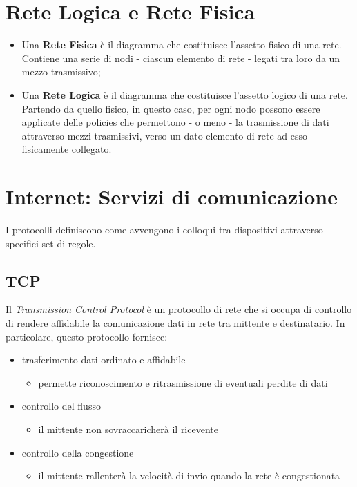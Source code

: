 \section{Rete Logica e Rete Fisica}
\begin{itemize}
    \item Una \textbf{Rete Fisica} è il diagramma che costituisce l'assetto fisico di una rete. Contiene una serie di nodi - ciascun elemento di rete - legati tra loro da un mezzo trasmissivo;
    \item Una \textbf{Rete Logica} è il diagramma che costituisce l'assetto logico di una rete. Partendo da quello fisico, in questo caso, per ogni nodo possono essere applicate delle policies che permettono - o meno - la trasmissione di dati attraverso mezzi trasmissivi, verso un dato elemento di rete ad esso fisicamente collegato.
\end{itemize}

\section{Internet: Servizi di comunicazione}
I protocolli definiscono come avvengono i colloqui tra dispositivi attraverso specifici set di regole.

\subsection{TCP}
Il \textit{Transmission Control Protocol} è un protocollo di rete che si occupa di controllo di rendere affidabile la comunicazione dati in rete tra mittente e destinatario.
In particolare, questo protocollo fornisce:
    \begin{itemize}
        \item trasferimento dati ordinato e affidabile
        \begin{itemize}
            \item permette riconoscimento e ritrasmissione di eventuali perdite di dati
        \end{itemize}
        \item controllo del flusso
        \begin{itemize}
            \item il mittente non sovraccaricherà il ricevente
        \end{itemize}
        \item controllo della congestione
        \begin{itemize}
            \item il mittente rallenterà la velocità di invio quando la rete è congestionata
        \end{itemize}
    \end{itemize}

